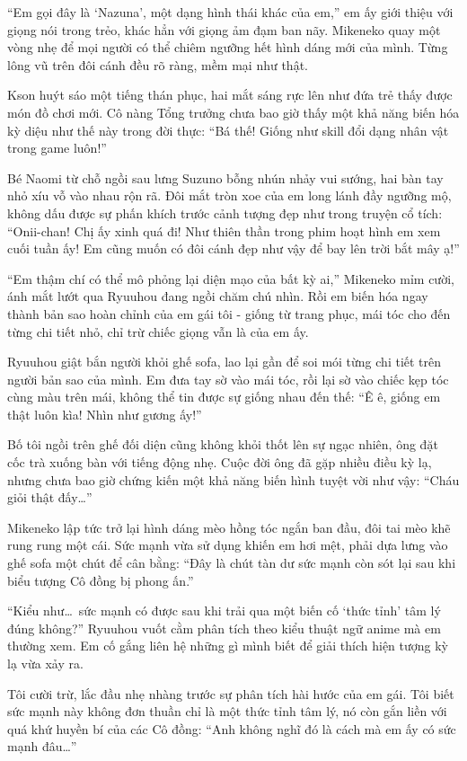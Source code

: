 ﻿\documentclass[../main.tex]{subfiles}
\begin{document}
``Em gọi đây là `Nazuna', một dạng hình thái khác của em,'' em ấy giới thiệu với giọng nói trong trẻo, khác hẳn với giọng ảm đạm ban nãy. Mikeneko quay một vòng nhẹ để mọi người có thể chiêm ngưỡng hết hình dáng mới của mình. Từng lông vũ trên đôi cánh đều rõ ràng, mềm mại như thật.

Kson huýt sáo một tiếng thán phục, hai mắt sáng rực lên như đứa trẻ thấy được món đồ chơi mới. Cô nàng Tổng trưởng chưa bao giờ thấy một khả năng biến hóa kỳ diệu như thế này trong đời thực: ``Bá thế! Giống như skill đổi dạng nhân vật trong game luôn!''

Bé Naomi từ chỗ ngồi sau lưng Suzuno bỗng nhún nhảy vui sướng, hai bàn tay nhỏ xíu vỗ vào nhau rộn rã. Đôi mắt tròn xoe của em long lánh đầy ngưỡng mộ, không dấu được sự phấn khích trước cảnh tượng đẹp như trong truyện cổ tích: ``Onii-chan! Chị ấy xinh quá đi! Như thiên thần trong phim hoạt hình em xem cuối tuần ấy! Em cũng muốn có đôi cánh đẹp như vậy để bay lên trời bắt mây ạ!''

``Em thậm chí có thể mô phỏng lại diện mạo của bất kỳ ai,'' Mikeneko mỉm cười, ánh mắt lướt qua Ryuuhou đang ngồi chăm chú nhìn. Rồi em biến hóa ngay thành bản sao hoàn chỉnh của em gái tôi - giống từ trang phục, mái tóc cho đến từng chi tiết nhỏ, chỉ trừ chiếc giọng vẫn là của em ấy.

Ryuuhou giật bắn người khỏi ghế sofa, lao lại gần để soi mói từng chi tiết trên người bản sao của mình. Em đưa tay sờ vào mái tóc, rồi lại sờ vào chiếc kẹp tóc cùng màu trên mái, không thể tin được sự giống nhau đến thế: ``Ê ê, giống em thật luôn kìa! Nhìn như gương ấy!''

Bố tôi ngồi trên ghế đối diện cũng không khỏi thốt lên sự ngạc nhiên, ông đặt cốc trà xuống bàn với tiếng động nhẹ. Cuộc đời ông đã gặp nhiều điều kỳ lạ, nhưng chưa bao giờ chứng kiến một khả năng biến hình tuyệt vời như vậy: ``Cháu giỏi thật đấy\dots''

Mikeneko lập tức trở lại hình dáng mèo hồng tóc ngắn ban đầu, đôi tai mèo khẽ rung rung một cái. Sức mạnh vừa sử dụng khiến em hơi mệt, phải dựa lưng vào ghế sofa một chút để cân bằng: ``Đây là chút tàn dư sức mạnh còn sót lại sau khi biểu tượng Cô đồng bị phong ấn.''

``Kiểu như\dots\ sức mạnh có được sau khi trải qua một biến cố `thức tỉnh' tâm lý đúng không?'' Ryuuhou vuốt cằm phân tích theo kiểu thuật ngữ anime mà em thường xem. Em cố gắng liên hệ những gì mình biết để giải thích hiện tượng kỳ lạ vừa xảy ra.

Tôi cười trừ, lắc đầu nhẹ nhàng trước sự phân tích hài hước của em gái. Tôi biết sức mạnh này không đơn thuần chỉ là một thức tỉnh tâm lý, nó còn gắn liền với quá khứ huyền bí của các Cô đồng: ``Anh không nghĩ đó là cách mà em ấy có sức mạnh đâu\dots''
\end{document}
